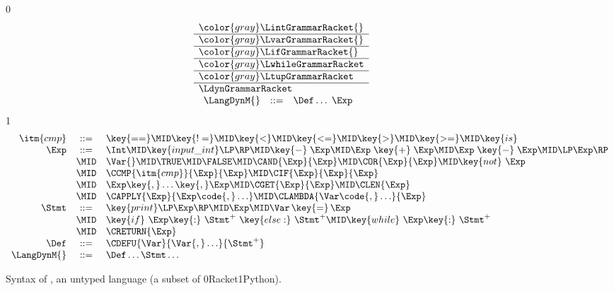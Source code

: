 \documentclass[7x10]{TimesAPriori_MIT}%
\newcommand{\gray}[1]{{\color{gray} #1}}
\def\racketEd{0}
\def\pythonEd{1}
\def\edition{0}
\newcommand{\racket}[1]{{\if\edition\racketEd{#1}\fi}}
\newcommand{\python}[1]{{\if\edition\pythonEd #1\fi}}
\numberwithin{theorem}{chapter}
\numberwithin{definition}{chapter}
\numberwithin{equation}{chapter}
\begin{document}
\newcommand{\LdynASTRacket}{
\begin{array}{lcl}
  \Exp &::=& \APPLY{\Exp}{\Exp\ldots} 
     \MID \LAMBDA{\LP\Var\ldots\RP}{\code{'Any}}{\Exp}\\
 \Def &::=& \FUNDEF{\Var}{\LP\Var\ldots\RP}{\code{'Any}}{\code{'()}}{\Exp} 
\end{array}
}

\begin{figure}[tp]
  \centering
  \begin{tcolorbox}[colback=white]  
    \small
{\if\edition\racketEd    
\[
\begin{array}{l}
  \gray{\LintGrammarRacket{}} \\ \hline
  \gray{\LvarGrammarRacket{}} \\ \hline
  \gray{\LifGrammarRacket{}} \\ \hline
  \gray{\LwhileGrammarRacket} \\ \hline
  \gray{\LtupGrammarRacket} \\ \hline
  \LdynGrammarRacket \\
\begin{array}{rcl}
\LangDynM{}  &::=& \Def\ldots\; \Exp
\end{array}
\end{array}
\]
\fi}
{\if\edition\pythonEd
\[
\begin{array}{rcl}
  \itm{cmp} &::= & \key{==} \MID \key{!=} \MID \key{<} \MID \key{<=} \MID \key{>} \MID \key{>=} \MID \key{is} \\
  \Exp &::=& \Int \MID \key{input\_int}\LP\RP \MID \key{-}\;\Exp \MID \Exp \; \key{+} \; \Exp \MID \Exp \; \key{-} \; \Exp \MID \LP\Exp\RP \\
  &\MID& \Var{} \MID \TRUE \MID \FALSE \MID \CAND{\Exp}{\Exp}
  \MID \COR{\Exp}{\Exp} \MID \key{not}~\Exp \\
  &\MID& \CCMP{\itm{cmp}}{\Exp}{\Exp}
      \MID \CIF{\Exp}{\Exp}{\Exp} \\
  &\MID& \Exp \key{,} \ldots \key{,} \Exp \MID \CGET{\Exp}{\Exp}
      \MID \CLEN{\Exp}  \\
   &\MID& \CAPPLY{\Exp}{\Exp\code{,} \ldots} 
    \MID \CLAMBDA{\Var\code{, }\ldots}{\Exp}\\
  \Stmt &::=& \key{print}\LP \Exp \RP \MID \Exp 
    \MID \Var\mathop{\key{=}}\Exp \\
   &\MID& \key{if}~ \Exp \key{:}~ \Stmt^{+} ~\key{else:}~ \Stmt^{+} 
   \MID \key{while}~ \Exp \key{:}~ \Stmt^{+} \\
    &\MID& \CRETURN{\Exp} \\
   \Def &::=& \CDEFU{\Var}{\Var{,} \ldots}{\Stmt^{+}} \\
  \LangDynM{} &::=& \Def\ldots \Stmt\ldots
\end{array}
\]
\fi}
  \end{tcolorbox}
\caption{Syntax of \LangDyn{}, an untyped language (a subset of \racket{Racket}\python{Python}).}
\label{fig:r7-concrete-syntax}
\end{figure}
\end{document}
